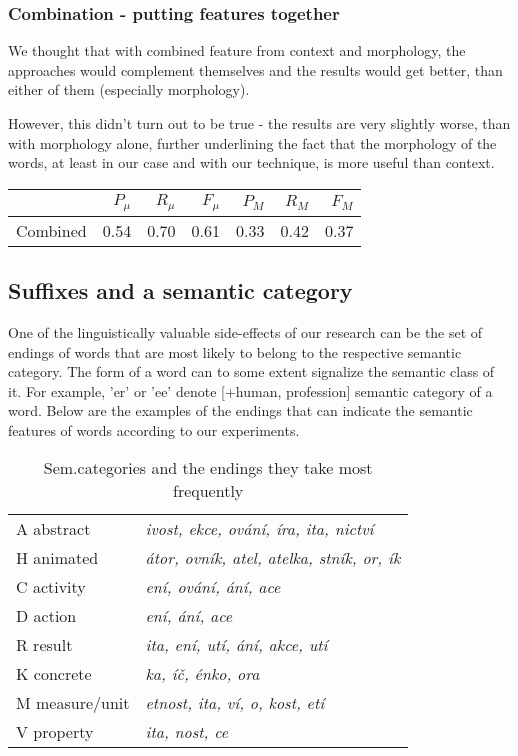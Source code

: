 \documentclass[letterpaper]{article}
\begin{document}
\subsubsection{Combination - putting features together}
We thought that with combined feature from context and morphology, the approaches would complement 
themselves and the results would get better, than either of them (especially morphology).

However, this didn't turn out to be true - the results are very slightly worse, than with morphology alone, 
further underlining the fact that the morphology of the words, at least in our case and with our technique, 
is more useful than context.

\begin{tabular}{|r|r|r|r|r|r|r|}
 \hline
 & $P_\mu$ & $R_\mu$ & $F_\mu$ & $P_M$ & $R_M$  & $F_M$ \\ \hline
Combined & 0.54 & 0.70 & 0.61 & 0.33 & 0.42 & 0.37 \\ \hline
\end{tabular}


\subsection{Suffixes and a semantic category}
One of the linguistically valuable side-effects of our research can be 
the set of endings of words that are most likely to belong to the
respective semantic category.
The form of a word can to some extent signalize the semantic class of it. 
For example, 'er' or 'ee' denote [+human, profession] semantic category of a word.
Below are the examples of the endings that
can indicate the semantic features of words according to our experiments.

\begin{table}[!h]
\begin{tabular}{ll}
\hline
A abstract & \textit{ivost, ekce, ování, íra, ita, nictví}\\
H animated & \textit{átor, ovník, atel, atelka, stník, or, ík}\\
C activity & \textit{ení, ování, ání, ace}\\
D action  & \textit{ení, ání, ace}\\
R result & \textit{ ita, ení, utí, ání, akce, utí}\\
K concrete & \textit{ka, íč, énko, ora}\\
M measure/unit & \textit{etnost, ita, ví, o, kost, etí}\\
V property & \textit{ita, nost, ce}\\
\hline
\end{tabular}
\caption{Sem.categories and the endings they take most frequently}
\end{table}
\end{document}
